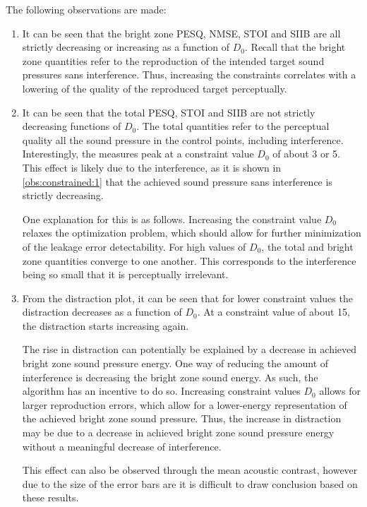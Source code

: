 The following observations are made:
\begin{enumerate}
    \item It can be seen that the bright zone PESQ, NMSE, STOI and SIIB are all strictly decreasing or increasing as a 
        function of $D_0$.
        Recall that the bright zone quantities refer to the reproduction of the intended target sound pressures sans 
        interference.
        Thus, increasing the constraints correlates with a lowering of the quality of the reproduced target
        perceptually.
        \label{obs:constrained:1}

    \item It can be seen that the total PESQ, STOI and SIIB are not strictly decreasing functions of $D_0$.
        The total quantities refer to the perceptual quality all the sound pressure in the control points,
        including interference.
        Interestingly, the measures peak at a constraint value $D_0$ of about 3 or 5. 
        This effect is likely due to the interference, as it is shown in \autoref{obs:constrained:1} that 
        the achieved sound pressure sans interference is strictly decreasing.

        One explanation for this is as follows.
        Increasing the constraint value $D_0$ relaxes the optimization problem, 
        which should allow for further minimization of the leakage error detectability.
        For high values of $D_0$, the total and bright zone quantities converge to one another.
        This corresponds to the interference being so small that it is perceptually irrelevant.
        \label{obs:constrained:2}

    \item From the distraction plot, it can be seen that for lower constraint values the distraction decreases as 
        a function of $D_0$.
        At a constraint value of about 15, the distraction starts increasing again.

        The rise in distraction can potentially be explained by a decrease in achieved bright zone sound pressure energy.
        One way of reducing the amount of interference is decreasing the bright zone sound energy.
        As such, the algorithm has an incentive to do so.
        Increasing constraint values $D_0$ allows for larger reproduction errors, which allow for a lower-energy
        representation of the achieved bright zone sound pressure.
        Thus, the increase in distraction may be due to a decrease in achieved bright zone sound pressure energy without
        a meaningful decrease of interference.

        This effect can also be observed through the mean acoustic contrast, however due to the size of the error bars are 
        it is difficult to draw conclusion based on these results.
        \label{obs:constrained:3}
\end{enumerate}
